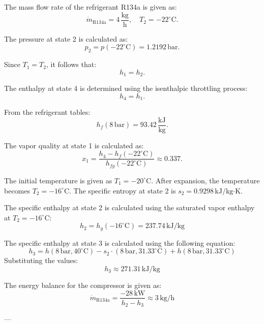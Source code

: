 The mass flow rate of the refrigerant R134a is given as:  
\[
\dot{m}_{\text{R134a}} = 4 \, \frac{\text{kg}}{\text{h}}, \quad T_2 = -22^\circ\text{C}.
\]  

The pressure at state 2 is calculated as:  
\[
p_2 = p(-22^\circ\text{C}) = 1.2192 \, \text{bar}.
\]  

Since \(T_1 = T_2\), it follows that:  
\[
h_1 = h_2.
\]  

The enthalpy at state 4 is determined using the isenthalpic throttling process:  
\[
h_4 = h_1.
\]  

From the refrigerant tables:  
\[
h_{f}(8 \, \text{bar}) = 93.42 \, \frac{\text{kJ}}{\text{kg}}.
\]  

The vapor quality at state 1 is calculated as:  
\[
x_1 = \frac{h_4 - h_f(-22^\circ\text{C})}{h_{fg}(-22^\circ\text{C})} \approx 0.337.
\]

The initial temperature is given as \( T_1 = -20^\circ\text{C} \). After expansion, the temperature becomes \( T_2 = -16^\circ\text{C} \). The specific entropy at state 2 is \( s_2 = 0.9298 \, \text{kJ/kg·K} \).  

The specific enthalpy at state 2 is calculated using the saturated vapor enthalpy at \( T_2 = -16^\circ\text{C} \):  
\[
h_2 = h_g(-16^\circ\text{C}) = 237.74 \, \text{kJ/kg}
\]  

The specific enthalpy at state 3 is calculated using the following equation:  
\[
h_3 = h(8 \, \text{bar}, 40^\circ\text{C}) - s_2 \cdot (8 \, \text{bar}, 31.33^\circ\text{C}) + h(8 \, \text{bar}, 31.33^\circ\text{C})
\]  
Substituting the values:  
\[
h_3 \approx 271.31 \, \text{kJ/kg}
\]  

The energy balance for the compressor is given as:  
\[
\dot{m}_{\text{R134a}} = \frac{-28 \, \text{kW}}{h_2 - h_3} \approx 3 \, \text{kg/h}
\]  

---